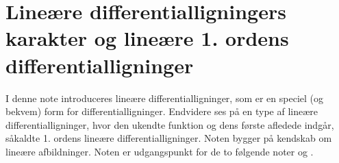 
\setcounter{chapter}{10} %


\chapter{Lineære differentialligningers karakter og lineære 1. ordens differentialligninger} \label{tn11}

\begin{basis}
I denne note introduceres lineære differentialligninger, som er en speciel (og bekvem) form for differentialligninger. Endvidere ses på en type af lineære differentialligninger, hvor den ukendte funktion og dens første afledede indgår, såkaldte 1. ordens lineære differentialligninger. \bs
Noten bygger på kendskab om lineære afbildninger. Noten er udgangspunkt for de to følgende noter  og .
\end{basis}

